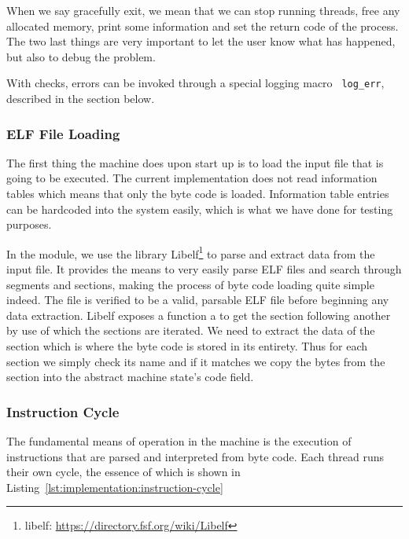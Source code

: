When we say gracefully exit, we mean that we can stop running threads, free any
allocated memory, print some information and set the return code of the
process. The two last things are very important to let the user know what has
happened, but also to debug the problem.

With checks, errors can be invoked through a special logging macro {\tt
  log\_err}, described in the  section
below.

\subsubsection{ELF File Loading}
The first thing the machine does upon start up is to load the input file that is
going to be executed. The current implementation does not read information
tables which means that only the byte code is loaded. Information table entries
can be hardcoded into the system easily, which is what we have done for testing
purposes.

In the  module, we use the library Libelf\footnote{libelf:
  \url{https://directory.fsf.org/wiki/Libelf}} to parse and extract data from
the input file. It provides the means to very easily parse ELF files and search
through segments and sections, making the process of byte code loading quite
simple indeed. The file is verified to be a valid, parsable ELF file before
beginning any data extraction. Libelf exposes a function a to get the section
following another by use of which the sections are iterated. We need to extract
the data of the  section which is where the byte code is stored in
its entirety. Thus for each section we simply check its name and if it matches
we copy the bytes from the section into the abstract machine state's code field.

\subsubsection{Instruction Cycle}

The fundamental means of operation in the machine is the execution of
instructions that are parsed and interpreted from byte code. Each thread runs
their own cycle, the essence of which is shown in
Listing~\ref{lst:implementation:instruction-cycle}

